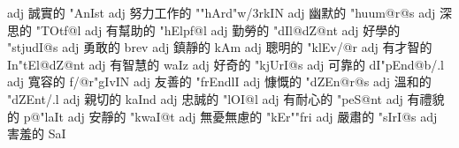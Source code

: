 \hwHeader
\bannerVocabulary
\begin{tzBD}{13}
           {adj}   {誠實的}        {}{"AnIst}  {}{}
     {adj}   {努力工作的}    {}{""hArd"w{/3r}kIN}{}{}
         {adj}   {幽默的}        {}{"huum@r@s}       {}{}
       {adj}   {深思的}        {}{"TOtf@l}         {}{}
          {adj}   {有幫助的}      {}{"hElpf@l}        {}{}
         {adj}   {勤勞的}        {}{"dIl@dZ@nt}      {}{}
         {adj}   {好學的}        {}{"stjudI@s}       {}{}
            {adj}   {勇敢的}        {}{brev}            {}{}
             {adj}   {鎮靜的}        {}{kAm}             {}{}
           {adj}   {聰明的}        {}{"klEv{/@r}}      {}{}
      {adj}   {有才智的}      {}{In"tEl@dZ@nt}    {}{}
             {adj}   {有智慧的}      {}{waIz}            {}{}
          {adj}   {好奇的}        {}{"kjUrI@s}{}{}
       {adj}   {可靠的}        {}{dI"pEnd@b{/.l}}  {}{}
        {adj}   {寬容的}        {}{f{/@r}"gIvIN}    {}{}
         {adj}   {友善的}        {}{"frEndlI}        {}{}
         {adj}   {慷慨的}        {}{"dZEn@r@s}       {}{}
           {adj}   {溫和的}        {}{"dZEnt{/.l}}     {}{}
             {adj}   {親切的}        {}{kaInd}           {}{}
            {adj}   {忠誠的}        {}{"lOI@l}          {}{}
          {adj}   {有耐心的}      {}{"peS@nt}         {}{}
           {adj}   {有禮貌的}      {}{p@"laIt}         {}{}
            {adj}   {安靜的}        {}{"kwaI@t}         {}{}
         {adj}   {無憂無慮的}    {}{"kEr""fri}       {}{}
          {adj}   {嚴肅的}        {}{"sIrI@s}         {}{}
              {adj}   {害羞的}        {}{SaI}             {}{}
\end{tzBD}

